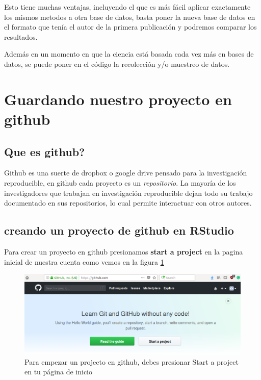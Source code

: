\documentclass[]{book}
\begin{document}
Esto tiene muchas ventajas, incluyendo el que es más fácil aplicar
exactamente los mismos metodos a otra base de datos, basta poner la
nueva base de datos en el formato que tenía el autor de la primera
publicación y podremos comparar los resultados.

Además en un momento en que la ciencia está basada cada vez más en bases
de datos, se puede poner en el código la recolección y/o muestreo de
datos.

\hypertarget{guardando-nuestro-proyecto-en-github}{%
\section{Guardando nuestro proyecto en
github}\label{guardando-nuestro-proyecto-en-github}}

\hypertarget{que-es-github}{%
\subsection{Que es github?}\label{que-es-github}}

Github es una suerte de dropbox o google drive pensado para la
investigación reproducible, en github cada proyecto es un
\emph{repositorio}. La mayoría de los investigadores que trabajan en
investigación reproducible dejan todo su trabajo documentado en sus
repositorios, lo cual permite interactuar con otros autores.

\hypertarget{creando-un-proyecto-de-github-en-rstudio}{%
\subsection{creando un proyecto de github en
RStudio}\label{creando-un-proyecto-de-github-en-rstudio}}

Para crear un proyecto en github presionamos \textbf{start a project} en
la pagina inicial de nuestra cuenta como vemos en la figura
\ref{fig:Start}

\begin{figure}

{\centering \includegraphics[width=0.8\linewidth]{StartAProject} 

}

\caption{Para empezar un projecto en github, debes presionar Start a project en tu página de inicio}\label{fig:Start}
\end{figure}
\end{document}

